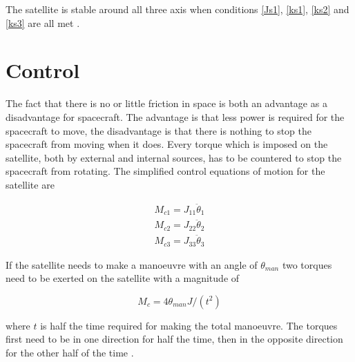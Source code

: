 The satellite is stable around all three axis when conditions \ref{Js1}, \ref{ks1}, \ref{ks2} and \ref{ks3} are all met \cite{chu13}.

\section{Control}
\label{sec:SCcont}
The fact that there is no or little friction in space is both an advantage as a disadvantage for spacecraft. The advantage is that less power is required for the spacecraft to move, the disadvantage is that there is nothing to stop the spacecraft from moving when it does. Every torque which is imposed on the satellite, both by external and internal sources, has to be countered to stop the spacecraft from rotating. The simplified control equations of motion for the satellite are

\begin{eqnarray}
M_{c1} = J_{11}\ddot{\theta}_1 \\
M_{c2} = J_{22}\ddot{\theta}_2 \\
M_{c3} = J_{33}\ddot{\theta}_3 
\end{eqnarray}

If the satellite needs to make a manoeuvre with an angle of $\theta_{man}$ two torques need to be exerted on the satellite with a magnitude of

\begin{equation}
M_{c} = 4\theta_{man}J/(t^2)
\label{reqtorque}
\end{equation}

where $t$ is half the time required for making the total manoeuvre. The torques first need to be in one direction for half the time, then in the opposite direction for the other half of the time \cite{chu22}. 